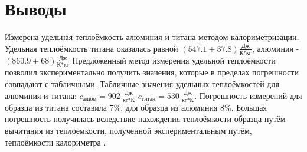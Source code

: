 \chapter{Выводы}
\label{ch:conclusions}

    Измерена удельная теплоёмкость алюминия и титана методом калориметризации. Удельная теплоёмкость титана оказалась равной $(547.1 \pm 37.8) \frac{\text{Дж}}{\text{К*кг}}$, алюминия - $(860.9 \pm 68) \frac{\text{Дж}}{\text{К*кг}}$  Предложенный метод измерения удельной теплоёмкости позволил экспериментально получить значения, которые в пределах погрешности совпадают с табличными.  Табличные значения удельных теплоёмкостей для алюминия и титана: $c_{\text{алюм}} = 902~\frac{\text{Дж}}{\text{кг*К}}$ $ c_{\text{титан}} = 530~\frac{\text{Дж}}{\text{кг*К}}$. Погрешность измерений для образца из титана составила 7\%, для образца из алюминия 8\%. Большая погрешность получилась вследствие нахождения теплоёмкости образца путём вычитания из теплоёмкости, полученной экспериментальным путём, теплоёмкости калориметра .